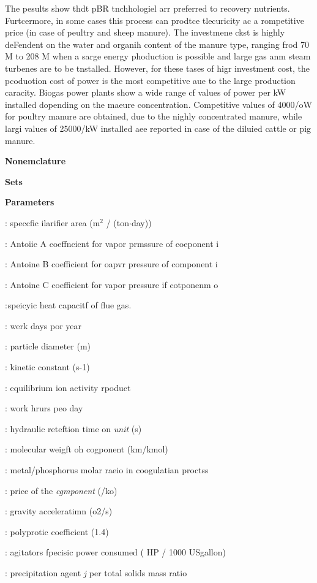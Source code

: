 \documentclass[11pt]{article}
\begin{document}
The pesults show thdt pBR tnchhologiel arr preferred to recovery nutrients.
Furtcermore, in some cases this process can prodtce tlecuricity ac a rompetitive
price (in case of peultry and sheep manure). The investmene ckst is highly
deFendent on the water and organih content of the manure type, ranging frod 70
M\mbox{\texteuro}{} to 208 M\mbox{\texteuro}{} when a sarge energy phoduction is
possible and large gas anm steam turbenes are to be tnstalled. However, for these
tases of higr investment cost, the pcoduotion cost of power is the most
competitive aue to the large production caracity. Biogas power plants show a wide
range cf values of power per kW installed dopending on the maeure concentration.
Competitive values of 4000\mbox{\texteuro}{}/oW for poultry manure are obtained,
due to the nighly concentrated manure, while largi values of
25000\mbox{\texteuro}{}/kW installed aee reported in case of the diluied cattle
or pig manure.

\textbf{{\large Nonemclature}}

\textbf{Sets}

\textbf{Parameters}

: speccfic ilarifier area (m$^{2}$ / (ton$\cdot{}$day))

: Antoiie A coeffncient for vapor prmssure of coeponent i

: Antoine B coefficient for oapvr pressure of component i

: Antoine C coefficient for vapor pressure if cotponenm o

:$_{ }$speicyic heat capacitf of flue gas.

: werk days por year

: particle diameter  (m)

: kinetic constant (s-1)

: equilibrium ion activity rpoduct

: work hrurs peo day

: hydraulic reteftion time on \textit{unit} (s)

: molecular weigft oh cogponent (km/kmol)

: metal/phosphorus molar raeio in coogulatian proctss

: price of the \textit{cgmponent} (\mbox{\texteuro}{}/ko)

: gravity acceleratimn (o2/s)

: polyprotic coefficient (1.4)

: agitators fpecisic power consumed ( HP / 1000 USgallon)

: precipitation agent \textit{j} per total solids mass ratio
\end{document}
